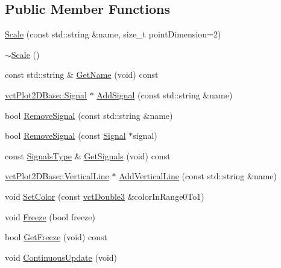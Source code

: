 \subsection*{Public Member Functions}
\begin{DoxyCompactItemize}
\item 
\hyperlink{classvct_plot2_d_base_1_1_scale_a1383daa58c4c2ce603a751ff9258558c}{Scale} (const std\+::string \&name, size\+\_\+t point\+Dimension=2)
\item 
\hyperlink{classvct_plot2_d_base_1_1_scale_ab718b2816c31e7a78093c198cd4aeefe}{$\sim$\+Scale} ()
\item 
const std\+::string \& \hyperlink{classvct_plot2_d_base_1_1_scale_a4b1a356d22ebfe5f277db5022f0219a6}{Get\+Name} (void) const 
\item 
\hyperlink{classvct_plot2_d_base_1_1_signal}{vct\+Plot2\+D\+Base\+::\+Signal} $\ast$ \hyperlink{classvct_plot2_d_base_1_1_scale_a67005ed4b0e8bd8c89a6b186f56fb212}{Add\+Signal} (const std\+::string \&name)
\item 
bool \hyperlink{classvct_plot2_d_base_1_1_scale_aaf43fbe7999fd1baba8fc8517fb4895b}{Remove\+Signal} (const std\+::string \&name)
\item 
bool \hyperlink{classvct_plot2_d_base_1_1_scale_a1126d671423cec3ae36a603ef3a92671}{Remove\+Signal} (const \hyperlink{classvct_plot2_d_base_1_1_signal}{Signal} $\ast$signal)
\item 
const \hyperlink{classvct_plot2_d_base_1_1_scale_aecdc247557c6ec3b7976596b42a4bc27}{Signals\+Type} \& \hyperlink{classvct_plot2_d_base_1_1_scale_a5e87d8b79805fa93432db0b84d428277}{Get\+Signals} (void) const 
\item 
\hyperlink{classvct_plot2_d_base_1_1_vertical_line}{vct\+Plot2\+D\+Base\+::\+Vertical\+Line} $\ast$ \hyperlink{classvct_plot2_d_base_1_1_scale_a84606196b9fb60404ea6cba5737b6e9f}{Add\+Vertical\+Line} (const std\+::string \&name)
\item 
void \hyperlink{classvct_plot2_d_base_1_1_scale_af435cf974388b55c8f044c3fc0d795c8}{Set\+Color} (const \hyperlink{vct_fixed_size_vector_types_8h_a4a89122c9d7f72c3f31fe8126e17c3af}{vct\+Double3} \&color\+In\+Range0\+To1)
\item 
void \hyperlink{classvct_plot2_d_base_1_1_scale_a396bd19c150f3a7542442b7afd8403a3}{Freeze} (bool freeze)
\item 
bool \hyperlink{classvct_plot2_d_base_1_1_scale_a70b4900ca146f2c700c0d7b800c8be98}{Get\+Freeze} (void) const 
\item 
void \hyperlink{classvct_plot2_d_base_1_1_scale_aecac590af41e0fd998fe7d8b6c91492e}{Continuous\+Update} (void)
\end{DoxyCompactItemize}
